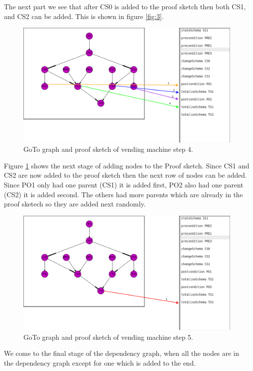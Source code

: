The next part we see that after CS0 is added to the proof sketch then both
CS1, and CS2 can be added. This is shown in figure \ref{fig:3}.

\begin{figure}[H]
\includegraphics[scale=0.3]{Figures/skeleton/4.png}
\caption{GoTo graph and proof sketch of vending machine step 4.}
\label{fig:4}
\end{figure}

Figure \ref{fig:4} shows the next stage of adding nodes to the Proof sketch.
Since CS1 and CS2 are now added to the proof sketch then the next row of nodes
can be added. Since PO1 only had one parent (CS1) it is added first, PO2 also
had one parent (CS2) it is added second. The others had more parents which are
already in the proof sketech so they are added next randomly.

\begin{figure}[H]
\includegraphics[scale=0.3]{Figures/skeleton/5.png}
\caption{GoTo graph and proof sketch of vending machine step 5.}
\label{fig:5}
\end{figure}

We come to the final stage of the dependency graph, when all the nodes are in
the dependency graph except for one which is added to the end.

